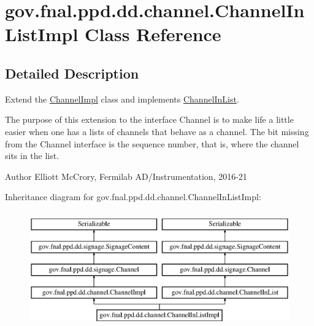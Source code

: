 \hypertarget{classgov_1_1fnal_1_1ppd_1_1dd_1_1channel_1_1ChannelInListImpl}{\section{gov.\-fnal.\-ppd.\-dd.\-channel.\-Channel\-In\-List\-Impl Class Reference}
\label{classgov_1_1fnal_1_1ppd_1_1dd_1_1channel_1_1ChannelInListImpl}
}


\subsection{Detailed Description}
Extend the \hyperlink{classgov_1_1fnal_1_1ppd_1_1dd_1_1channel_1_1ChannelImpl}{Channel\-Impl} class and implements \hyperlink{interfacegov_1_1fnal_1_1ppd_1_1dd_1_1channel_1_1ChannelInList}{Channel\-In\-List}.

The purpose of this extension to the interface Channel is to make life a little easier when one has a lists of channels that behave as a channel. The bit missing from the Channel interface is the sequence number, that is, where the channel sits in the list.

\begin{DoxyAuthor}{Author}
Elliott Mc\-Crory, Fermilab A\-D/\-Instrumentation, 2016-\/21 
\end{DoxyAuthor}
Inheritance diagram for gov.\-fnal.\-ppd.\-dd.\-channel.\-Channel\-In\-List\-Impl\-:\begin{figure}[H]
\begin{center}
\leavevmode
\includegraphics[height=5.000000cm]{classgov_1_1fnal_1_1ppd_1_1dd_1_1channel_1_1ChannelInListImpl}
\end{center}
\end{figure}
